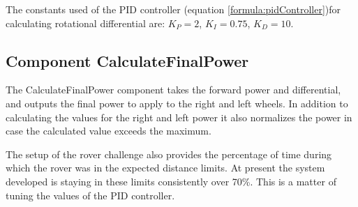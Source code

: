 The constants used of the PID controller (equation \ref{formula:pidController})for calculating rotational differential are: $K_P = 2$, $K_I=0.75$, $K_D=10$.

\subsection{Component CalculateFinalPower}
The \textsf{CalculateFinalPower} component takes the forward power and differential, and outputs the final power to apply to the right and left wheels. In addition to calculating the values for the right and left power it also normalizes the power in case the calculated value exceeds the maximum.

The setup of the rover challenge also provides the percentage of time during which the rover was in the expected distance limits. At present the system developed is staying in these limits consistently over 70\%. This is a matter of tuning the values of the PID controller.